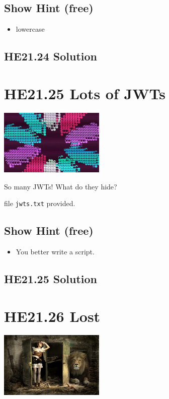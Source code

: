 \documentclass[english,a4paper,nols,noindent]{tufte-handout}
\begin{document}
\subsection{Show Hint (free)}
\begin{itemize}
\item lowercase
\end{itemize}

\hypertarget{he21.24-solution}{%
\subsection{HE21.24 Solution}\label{he21.24-solution}}

\noindent 


\hypertarget{he21.25}{%
  \section{HE21.25 Lots of JWTs}
  \label{he21.25}}
\begin{marginfigure}
    \includegraphics[width=50mm]{images/challenge25.jpg}
\end{marginfigure}

\noindent So many JWTs! What do they hide?

file \verb+jwts.txt+ provided.

\subsection{Show Hint (free)}
\begin{itemize}
\item You better write a script.
\end{itemize}

\hypertarget{he21.25-solution}{%
\subsection{HE21.25 Solution}\label{he21.25-solution}}

\noindent 


\hypertarget{he21.26}{%
  \section{HE21.26 Lost}
  \label{he21.26}}
\begin{marginfigure}
    \includegraphics[width=50mm]{images/challenge26.jpg}
\end{marginfigure}
\end{document}
